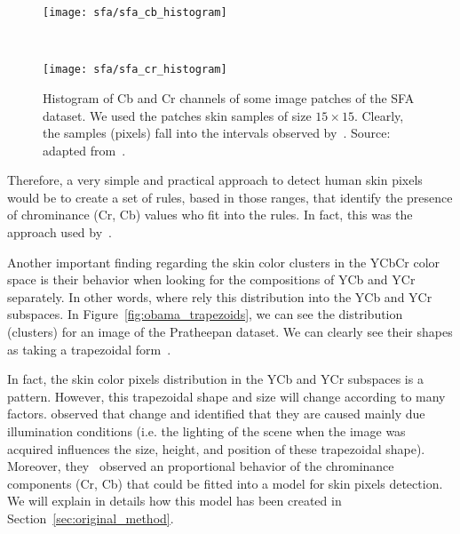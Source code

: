\begin{figure}[!ht]
    \centering
    \begin{minipage}{0.485\textwidth}
        \texttt{[image: sfa/sfa\_cb\_histogram]}
    \end{minipage}
    ~ %
    \begin{minipage}{0.485\textwidth}
        \texttt{[image: sfa/sfa\_cr\_histogram]}
    \end{minipage}
    \caption[Histogram of Cb and Cr channels of some image patches of the SFA dataset]{Histogram of Cb and Cr channels of some image patches of the SFA dataset. We used the patches skin samples of size $15 \times 15$. Clearly, the samples (pixels) fall into the intervals observed by~\citet{chai:99}. Source: adapted from~\citet{chai:99}.}
    \label{fig:dataset_sfa_ycbcr_hist}
\end{figure}

Therefore, a very simple and practical approach to detect human skin pixels would be to create a set of rules, based in those ranges, that identify the presence of chrominance (Cr, Cb) values who fit into the rules. In fact, this was the approach used by~\citet{chai:99}.

Another important finding regarding the skin color clusters in the YCbCr color space is their behavior when looking for the compositions of YCb and YCr separately. In other words, where rely this distribution into the YCb and YCr subspaces. In Figure~\ref{fig:obama_trapezoids}, we can see the distribution (clusters) for an image of the Pratheepan dataset. We can clearly see their shapes as taking a trapezoidal form~\citep{hsu:02}.

In fact, the skin color pixels distribution in the YCb and YCr subspaces is a pattern. However, this trapezoidal shape and size will change according to many factors. \citet{brancati:17} observed that change and identified that they are caused mainly due illumination conditions (i.e. the lighting of the scene when the image was acquired influences the size, height, and position of these trapezoidal shape). Moreover, they~\citep{brancati:17} observed an proportional behavior of the chrominance components (Cr, Cb) that could be fitted into a model for skin pixels detection. We will explain in details how this model has been created in Section~\ref{sec:original_method}.

